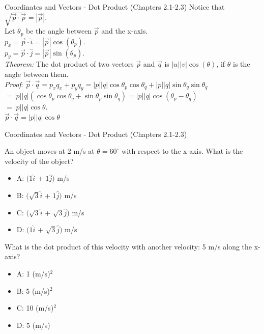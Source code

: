\documentclass{beamer}
\begin{document}
\begin{frame}{Coordinates and Vectors - Dot Product (Chapters 2.1-2.3)}
Notice that $\sqrt{\vec{p}\cdot\vec{p}} = |\vec{p}|$.\\
Let $\theta_p$ be the angle between $\vec{p}$ and the x-axis.  \\
$p_{x} = \vec{p} \cdot \hat{i} = |\vec{p}| \cos(\theta_{p})$. \\
$p_{y} = \vec{p} \cdot \hat{j} = |\vec{p}| \sin(\theta_{p})$.\\
\vspace{0.5cm}
\textit{Theorem:} The dot product of two vectors $\vec{p}$ and $\vec{q}$ is $|u||v|\cos(\theta)$, if $\theta$ is the angle between them.\\
\vspace{0.5cm}
\textit{Proof}: $\vec{p}\cdot\vec{q} = p_{x}q_{x} + p_{y}q_{y} = |p||q|\cos\theta_p\cos\theta_q+|p||q|\sin\theta_q\sin\theta_q$ \\
$=|p||q|(\cos\theta_p\cos\theta_q+\sin\theta_p\sin\theta_q) = |p||q|\cos(\theta_p-\theta_q)$ \\
$=|p||q|\cos\theta$. \\
\vspace{0.1cm}
$\boxed{\vec{p}\cdot\vec{q}=|p||q|\cos\theta}$
\end{frame}

\begin{frame}{Coordinates and Vectors - Dot Product (Chapters 2.1-2.3)}
\small
\begin{minipage}[b]{0.45\linewidth}
An object moves at 2 m/s at $\theta = 60^{\circ}$ with respect to the x-axis.  What is the velocity of the object?
\vspace{0.2cm}
\begin{itemize}
\item A: $(1\hat{i}$ + $1\hat{j})$  m/s
\item B: $(\sqrt{3}\hat{i}$ + $1\hat{j})$  m/s
\item C: $(\sqrt{3}\hat{i}$ + $\sqrt{3}\hat{j})$  m/s
\item D: $(1\hat{i}$ + $\sqrt{3}\hat{j})$  m/s
\end{itemize}
\end{minipage}
\hspace{0.5cm}
\begin{minipage}[b]{0.45\linewidth}
What is the dot product of this velocity with another velocity: 5 m/s along the x-axis?
\vspace{0.7cm}
\begin{itemize}
\item A: 1 (m/s)$^2$
\item B: 5 (m/s)$^2$
\item C: 10 (m/s)$^2$
\item D: 5 (m/s)
\end{itemize}
\end{minipage}
\end{frame}
\end{document}
